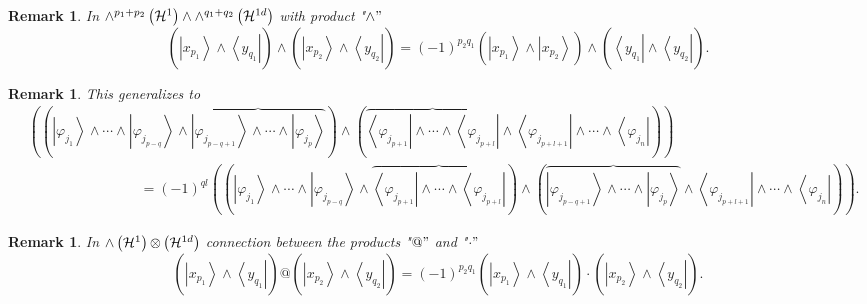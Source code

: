 \documentclass[aps,preprint]{revtex4}%
\newtheorem{remark}[theorem]{Remark}
\begin{document}
\begin{remark}
In ${\huge \wedge}^{p_{1}+p_{2}}\left(  \mathcal{H}^{1}\right)  \wedge
{\huge \wedge}^{q_{1}+q_{2}}\left(  \mathcal{H}^{1d}\right)  $ with product
"$\wedge"$%
\begin{equation}
\left(  \overset{}{\left\vert x_{p_{1}}\right\rangle \wedge\left\langle
y_{q_{1}}\right\vert }\right)  \wedge\left(  \overset{}{\left\vert x_{p_{2}%
}\right\rangle \wedge\left\langle y_{q_{2}}\right\vert }\right)  =\left(
-1\right)  ^{p_{2}q_{1}}\left(  \overset{}{\left\vert x_{p_{1}}\right\rangle
\wedge\left\vert x_{p_{2}}\right\rangle }\right)  \wedge\left(
\overset{}{\left\langle y_{q_{1}}\right\vert \wedge\left\langle y_{q_{2}%
}\right\vert }\right)  .
\end{equation}

\end{remark}

\begin{remark}
This generalizes to
\begin{align}
&  \left(  \left(  \left\vert \varphi_{j_{1}}\right\rangle \wedge\cdots
\wedge\left\vert \varphi_{j_{p-q}}\right\rangle \wedge\overbrace{\left\vert
\varphi_{j_{p-q+1}}\right\rangle \wedge\cdots\wedge\left\vert \varphi_{j_{p}%
}\right\rangle }\right)  \wedge\left(  \overbrace{\left\langle \varphi
_{j_{p+1}}\right\vert \wedge\cdots\wedge\left\langle \varphi_{j_{p+l}%
}\right\vert }\wedge\left\langle \varphi_{j_{p+l+1}}\right\vert \wedge
\cdots\wedge\left\langle \varphi_{j_{n}}\right\vert \right)  \right) \\
&  \left.  \qquad\qquad\qquad\qquad=\right.  \left(  -1\right)  ^{ql}\left(
\left(  \left\vert \varphi_{j_{1}}\right\rangle \wedge\cdots\wedge\left\vert
\varphi_{j_{p-q}}\right\rangle \wedge\overbrace{\left\langle \varphi_{j_{p+1}%
}\right\vert \wedge\cdots\wedge\left\langle \varphi_{j_{p+l}}\right\vert
}\right)  \wedge\left(  \overbrace{\left\vert \varphi_{j_{p-q+1}}\right\rangle
\wedge\cdots\wedge\left\vert \varphi_{j_{p}}\right\rangle }\wedge\left\langle
\varphi_{j_{p+l+1}}\right\vert \wedge\cdots\wedge\left\langle \varphi_{j_{n}%
}\right\vert \right)  \right)  .
\end{align}

\end{remark}

\begin{remark}
In ${\huge \wedge}\left(  \mathcal{H}^{1}\right)  {\normalsize \otimes}\left(
\mathcal{H}^{1d}\right)  $ connection between the products "$@"$ and
"$\cdot"$
\begin{equation}
\left(  \overset{}{\left\vert x_{p_{1}}\right\rangle \wedge\left\langle
y_{q_{1}}\right\vert }\right)  @\left(  \overset{}{\left\vert x_{p_{2}%
}\right\rangle \wedge\left\langle y_{q_{2}}\right\vert }\right)  =\left(
-1\right)  ^{p_{2}q_{1}}\left(  \overset{}{\left\vert x_{p_{1}}\right\rangle
\wedge\left\langle y_{q_{1}}\right\vert }\right)  \cdot\left(
\overset{}{\left\vert x_{p_{2}}\right\rangle \wedge\left\langle y_{q_{2}%
}\right\vert }\right)  .
\end{equation}

\end{remark}
\end{document}
